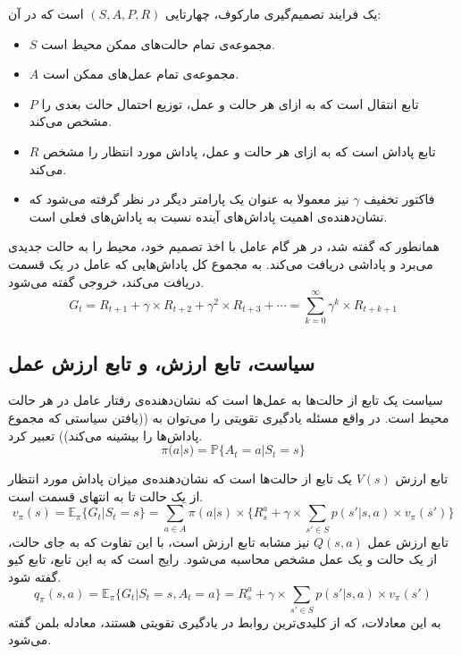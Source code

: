   یک فرایند تصمیم‌گیری مارکوف، چهارتایی 
  $(S, A, P, R)$
  است که در آن:
  \begin{itemize}
      \item $S$ مجموعه‌ی تمام حالت‌های ممکن محیط است.
      \item $A$ مجموعه‌ی تمام عمل‌های ممکن است.
      \item $P$ تابع انتقال 
      است که به ازای هر حالت و عمل، توزیع احتمال حالت بعدی را مشخص می‌کند.
      \item $R$ تابع پاداش 
      است که به ازای هر حالت و عمل، پاداش مورد انتظار را مشخص می‌کند.
      \item فاکتور تخفیف $\gamma$ نیز معمولا به عنوان یک پارامتر دیگر در نظر گرفته می‌شود که نشان‌دهنده‌ی اهمیت پاداش‌های آینده نسبت به پاداش‌های فعلی است.
  \end{itemize}
همانطور که گفته شد، در هر گام عامل با اخذ تصمیم خود، محیط را به حالت جدیدی می‌برد و پاداشی دریافت می‌کند.
به مجموع کل پاداش‌هایی که عامل در یک قسمت دریافت می‌کند، خروجی 
 گفته می‌شود.
 \begin{equation}\label{eq:return}
     G_t = R_{t+1} + \gamma \times R_{t+2} + \gamma^2 \times R_{t+3} + \cdots = \sum_{k=0}^\infty \gamma^k \times R_{t+k+1}
 \end{equation}
\subsection{سیاست، تابع ارزش، و تابع ارزش عمل}
سیاست 
یک تابع از حالت‌ها به عمل‌ها است که نشان‌دهنده‌ی رفتار عامل در هر حالت محیط است.
در واقع مسئله یادگیری تقویتی را می‌توان به ((یافتن سیاستی که مجموع پاداش‌ها را بیشینه می‌کند)) تعبیر کرد.
\begin{equation}\label{eq:policy}
    \pi(a|s) = \mathbb{P}\{A_t = a | S_t = s\}
\end{equation}

تابع ارزش  $V(s)$
یک تابع از حالت‌ها است که نشان‌دهنده‌ی میزان پاداش مورد انتظار از یک حالت تا به انتهای قسمت است.
\begin{equation}\label{eq:value_function}
    v_\pi(s) = \mathbb{E}_\pi\{G_t | S_t = s\} = \sum_{a \in A}\pi(a|s)\times\{R_s^a + \gamma \times \sum_{s' \in S}p(s'|s,a)\times v_\pi(s')\}
\end{equation}
تابع ارزش عمل  $Q(s, a)$
نیز مشابه تابع ارزش است، با این تفاوت که به جای حالت، از یک حالت و یک عمل مشخص محاسبه می‌شود. رایج است که به این تابع، تابع کیو گفته شود.
\begin{equation}\label{eq:q_function}
    q_\pi(s,a) = \mathbb{E}_\pi\{G_t | S_t = s, A_t = a\} = R_s^a + \gamma \times \sum_{s' \in S}p(s'|s,a)\times v_\pi(s')
\end{equation}
به این معادلات، که از کلیدی‌ترین روابط در یادگیری تقویتی هستند، معادله بلمن  گفته می‌شود.
